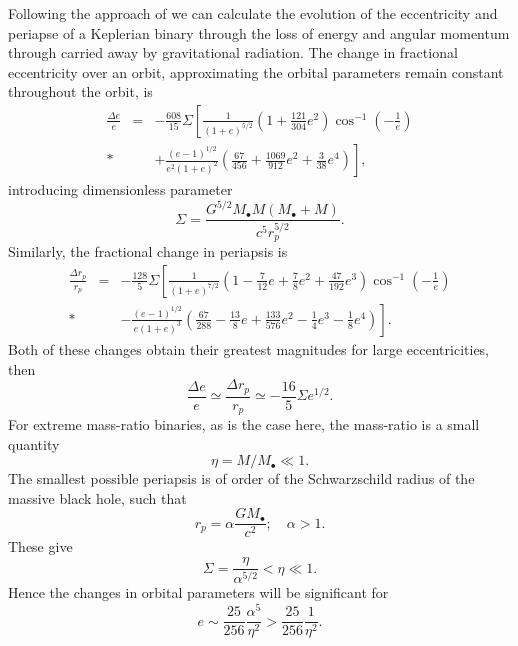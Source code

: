 \documentclass[useAMS,usedcolumn,usegraphicx,usenatbib]{mn2e}
\newcommand{\recip}[1]{\ensuremath{\frac{1}{#1}}}
\begin{document}
Following the approach of \citet{Turner1977} we can calculate the evolution of the eccentricity and periapse of a Keplerian binary through the loss of energy and angular momentum through carried away by gravitational radiation. The change in fractional eccentricity over an orbit, approximating the orbital parameters remain constant throughout the orbit, is
\begin{eqnarray}
\frac{\Delta e}{e} & = & -\frac{608}{15}\Sigma\left[\recip{(1+e)^{5/2}}\left(1 + \frac{121}{304}e^2\right)\cos^{-1}\left(-\recip{e}\right)\right. \nonumber\\*
 & & \left. + \frac{(e - 1)^{1/2}}{e^2(1+e)^2}\left(\frac{67}{456} + \frac{1069}{912}e^2 + \frac{3}{38}e^4\right)\right],
\end{eqnarray}
introducing dimensionless parameter
\begin{equation}
\Sigma = \frac{G^{5/2}M_\bullet M(M_\bullet+ M)}{c^5r_p^{5/2}}.
\end{equation}
Similarly, the fractional change in periapsis is
\begin{eqnarray}
\frac{\Delta r_p}{r_p} & = & -\frac{128}{5}\Sigma\left[\recip{(1+e)^{7/2}}\left(1 - \frac{7}{12}e + \frac{7}{8}e^2 + \frac{47}{192}e^3\right)\cos^{-1}\left(-\recip{e}\right)\right. \nonumber \\*
 & & \left. - \frac{(e - 1)^{1/2}}{e(1 + e)^3}\left(\frac{67}{288} - \frac{13}{8}e + \frac{133}{576}e^2 - \frac{1}{4}e^3 - \frac{1}{8}e^4\right)\right].
\end{eqnarray}
Both of these changes obtain their greatest magnitudes for large eccentricities, then
\begin{equation}
\frac{\Delta e}{e} \simeq \frac{\Delta r_p}{r_p} \simeq -\frac{16}{5}\Sigma e^{1/2}.
\end{equation}
For extreme mass-ratio binaries, as is the case here, the mass-ratio is a small quantity
\begin{equation}
\eta = M/M_\bullet \ll 1.
\end{equation}
The smallest possible periapsis is of order of the Schwarzschild radius of the massive black hole, such that 
\begin{equation}
r_p = \alpha\frac{GM_\bullet}{c^2}; \quad \alpha > 1.
\end{equation}
These give
\begin{equation}
\Sigma = \frac{\eta}{\alpha^{5/2}} < \eta \ll 1.
\end{equation}
Hence the changes in orbital parameters will be significant for
\begin{equation}
e \sim \frac{25}{256}\frac{\alpha^5}{\eta^2} > \frac{25}{256}\recip{\eta^2}.
\end{equation}

\bsp

\label{lastpage}
\end{document}
